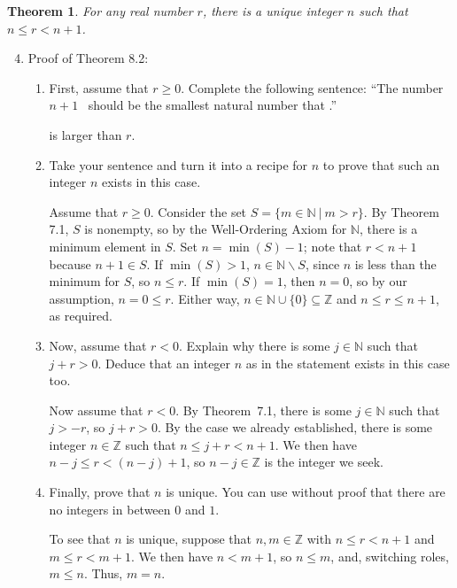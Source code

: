 \documentclass[12pt]{amsart}
\newcommand{\Z}{\mathbb{Z}}
\newcommand{\N}{\mathbb{N}}
\numberwithin{equation}{section}
\theoremstyle{plain} %
\newtheorem{thm}[equation]{Theorem}
\theoremstyle{definition}
\theoremstyle{remark}
\begin{document}
\begin{thm} For any real number $r$, there is a unique integer $n$ such that $n\leq r < n+1$.
\end{thm}

\begin{enumerate}\setcounter{enumi}{3}
\item Proof of Theorem 8.2:
\begin{enumerate}
\item First, assume that $r\geq 0$. Complete the following sentence:
``The number  $n+1$ \ should be the smallest natural number that \underline{\phantom{bananananananana}}.''
\begin{framed} is larger than $r$.\end{framed}
\item Take your sentence and turn it into a recipe for $n$ to prove that such an integer $n$ exists in this case.
\begin{framed} Assume that $r\geq 0$. Consider the set $S=\{ m\in \N \ | \ m> r\}$. By Theorem 7.1, $S$ is nonempty, so by the Well-Ordering Axiom for $\N$, there is a minimum element in $S$. Set $n=\min(S)-1$; note that $r<n+1$ because $n+1\in S$. If $\min(S)>1$, $n\in \N \smallsetminus S$, since $n$ is less than the minimum for $S$, so $n\leq r$.  If $\min(S)=1$, then $n=0$, so by our assumption, $n=0\leq r$.
Either way, $n\in \N\cup \{0\} \subseteq \Z$ and $n\leq r \leq n+1$, as required.
\end{framed}
\item Now, assume that $r<0$. Explain why there is some $j\in \N$ such that $j+r >0$. Deduce that an integer $n$ as in the statement exists in this case too.
\begin{framed}
Now assume that $r<0$. By Theorem~7.1, there is some $j\in \N$ such that $j>-r$, so $j+r>0$. By the case we already established, there is some integer $n\in \Z$ such that $n \leq j+r < n+1$. We then have $n-j \leq r < (n-j)+1$, so $n-j\in \Z$ is the integer we seek.
\end{framed}
\item Finally, prove that $n$ is unique. You can use without proof that there are no integers in between $0$ and $1$.
\begin{framed} To see that $n$ is unique, suppose that $n,m\in \Z$ with $n\leq r < n+1$ and $m\leq r < m+1$. We then have $n < m+1$, so $n\leq m$, and, switching roles, $m\leq n$. Thus, $m=n$.
\end{framed}
\end{enumerate}\end{enumerate}
\end{document}
